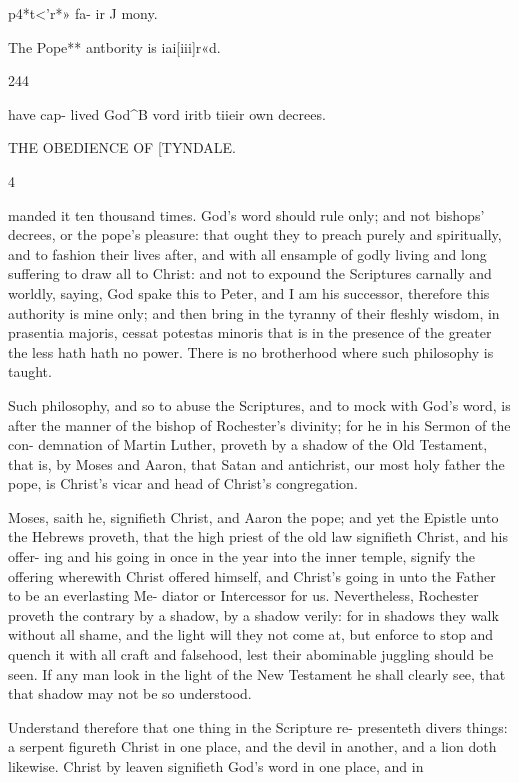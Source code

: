 \documentclass{custom}
\begin{document}
{p4*t<'r*» fa- 
ir J mony. 

The Pope** 
antbority is
iai[iii]r«d.


244 

have cap- 
lived God^B 
vord iritb 
tiieir own 
decrees. 

THE OBEDIENCE OF
[TYNDALE.

4 

manded it ten thousand times. God's word should rule
only; and not bishops' decrees, or the pope's pleasure: that
ought they to preach purely and spiritually, and to fashion 
their lives after, and with all ensample of godly living and 
long suffering to draw all to Christ: and not to expound 
the Scriptures carnally and worldly, saying, God spake this 
to Peter, and I am his successor, therefore this authority 
is mine only; and then bring in the tyranny of their fleshly 
wisdom, in prasentia majoris, cessat potestas minoris that is
in the presence of the greater the less hath hath no power.
There is no brotherhood where such philosophy is taught. 

Such philosophy, and so to abuse the Scriptures, and to
mock with God's word, is after the manner of the bishop 
of Rochester's divinity; for he in his Sermon of the con- 
demnation of Martin Luther, proveth by a shadow of the 
Old Testament, that is, by Moses and Aaron, that Satan 
and antichrist, our most holy father the pope, is Christ's 
vicar and head of Christ's congregation. 

Moses, saith he, signifieth Christ, and Aaron the pope; 
and yet the Epistle unto the Hebrews proveth, that the 
high priest of the old law signifieth Christ, and his offer- 
ing and his going in once in the year into the inner temple, 
signify the offering wherewith Christ offered himself, and 
Christ's going in unto the Father to be an everlasting Me- 
diator or Intercessor for us. Nevertheless, Rochester 
proveth the contrary by a shadow, by a shadow verily: for 
in shadows they walk without all shame, and the light will 
they not come at, but enforce to stop and quench it with 
all craft and falsehood, lest their abominable juggling 
should be seen. If any man look in the light of the New 
Testament he shall clearly see, that that shadow may not
be so understood.

Understand therefore that one thing in the Scripture re- 
presenteth divers things: a serpent figureth Christ in one 
place, and the devil in another, and a lion doth likewise. 
Christ by leaven signifieth God's word in one place, and in 


}
\end{document}
